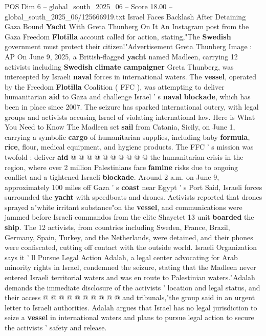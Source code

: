 \begin{textsample}{POS Dim 6 – global\_south\_2025\_06 – Score 18.00 – global\_south\_2025\_06/125666919.txt}  \label{ex:f6_pos_002}
Israel Faces Backlash After Detaining Gaza Bound \textbf{Yacht} With Greta Thunberg On It An Instagram post from the Gaza Freedom \textbf{Flotilla} account called for action, stating,"The \textbf{Swedish} government must protect their citizen!"Advertisement Greta Thunberg Image : AP On June 9, 2025, a British-flagged \textbf{yacht} named Madleen, carrying 12 activists including \textbf{Swedish} \textbf{climate} \textbf{campaigner} Greta Thunberg, was intercepted by Israeli \textbf{naval} forces in international waters.
The \textbf{vessel}, operated by the Freedom \textbf{Flotilla} Coalition ( FFC ), was attempting to deliver humanitarian \textbf{aid} to Gaza and challenge Israel ' s \textbf{naval} \textbf{blockade}, which has been in place since 2007.
The seizure has sparked international outcry, with legal groups and activists accusing Israel of violating international law.
Here is What You Need to Know The Madleen set \textbf{sail} from Catania, Sicily, on June 1, carrying a symbolic \textbf{cargo} of humanitarian supplies, including baby \textbf{formula}, \textbf{rice}, flour, medical equipment, and hygiene products.
The FFC ' s mission was twofold : deliver \textbf{aid} @ @ @ @ @ @ @ @ @ @ the humanitarian crisis in the region, where over 2 million Palestinians face \textbf{famine} risks due to ongoing conflict and a tightened Israeli \textbf{blockade}.
Around 2 a.m. on June 9, approximately 100 miles off Gaza ' s \textbf{coast} near Egypt ' s Port Said, Israeli forces surrounded the \textbf{yacht} with speedboats and drones.
Activists reported that drones sprayed a"white irritant substance"on the \textbf{vessel}, and communications were jammed before Israeli commandos from the elite Shayetet 13 unit \textbf{boarded} the \textbf{ship}.
The 12 activists, from countries including Sweden, France, Brazil, Germany, Spain, Turkey, and the Netherlands, were detained, and their phones were confiscated, cutting off contact with the outside world.
Israeli Organization says it ' ll Pursue Legal Action Adalah, a legal center advocating for Arab minority rights in Israel, condemned the seizure, stating that the Madleen never entered Israeli territorial waters and was en route to Palestinian waters."Adalah demands the immediate disclosure of the activists ' location and legal status, and their access @ @ @ @ @ @ @ @ @ @ and tribunals,"the group said in an urgent letter to Israeli authorities.
Adalah argues that Israel has no legal jurisdiction to seize a \textbf{vessel} in international waters and plans to pursue legal action to secure the activists ' safety and release.

\end{textsample}
